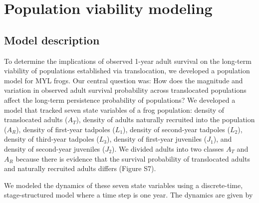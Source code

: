 \documentclass[9pt,twocolumn,twoside,lineno]{pnas-new}
\begin{document}
{\hypertarget{population-viability-modeling}{%
\section*{Population viability
modeling}\label{population-viability-modeling}}

\hypertarget{model-description}{%
\subsection*{Model description}\label{model-description}}

To determine the implications of observed 1-year adult survival on the
long-term viability of populations established via translocation, we
developed a population model for MYL frogs. Our central question was:
How does the magnitude and variation in observed adult survival
probability across translocated populations affect the long-term
persistence probability of populations? We developed a model that
tracked seven state variables of a frog population: density of
translocated adults (\(A_T\)), density of adults naturally recruited
into the population (\(A_R\)), density of first-year tadpoles (\(L_1\)),
density of second-year tadpoles (\(L_2\)), density of third-year
tadpoles (\(L_3\)), density of first-year juveniles (\(J_1\)), and
density of second-year juveniles (\(J_2\)). We divided adults into two
classes \(A_T\) and \(A_R\) because there is evidence that the survival
probability of translocated adults and naturally recruited adults
differs (Figure S7).

We modeled the dynamics of these seven state variables using a
discrete-time, stage-structured model where a time step is one year. The
dynamics are given by

}
\end{document}
